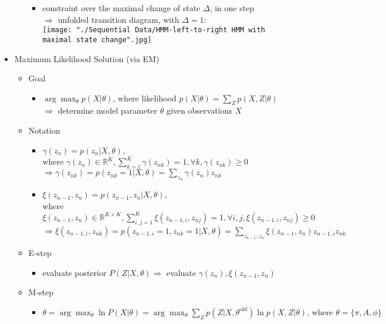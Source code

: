 \begin{itemize}
\begin{itemize}
\begin{itemize}
		\item constraint over the maximal change of state $\Delta$, in one step \\
		$\Rightarrow$ unfolded transition diagram, with $\Delta=1$: \\ 
		\texttt{[image: "./Sequential Data/HMM-left-to-right HMM with maximal state change".jpg]}
		\end{itemize}
	\end{itemize}

\item Maximum Likelihood Solution (via EM)
	\begin{itemize}
	\item Goal
		\begin{itemize}
		\item $\displaystyle \arg\max_{\theta} p(X|\theta)$, where likelihood $\displaystyle p(X|\theta) = \sum_Z p(X,Z|\theta)$ \\
		$\Rightarrow$ determine model parameter $\theta$ given observations $X$
		\end{itemize}
	\item Notation
		\begin{itemize}
		\item $\gamma(z_n) = p(z_n|X,\theta)$, \\
		where $\displaystyle \gamma(z_n) \in \mathbb R^{K} , \sum_{k=1}^K \gamma(z_{nk}) = 1,\forall k,\gamma(z_{nk})\ge0$ \\ 
		$\displaystyle\Rightarrow \gamma(z_{nk}) = p(z_{nk}=1|X,\theta) = \sum_{z_n}\gamma(z_n)z_{nk}$ 
		\item $\xi(z_{n-1},z_n) = p(z_{n-1},z_n|X,\theta)$, \\
		where $\displaystyle \xi(z_{n-1},z_n)\in\mathbb R^{K\times K},\sum_{i,j=1}^K \xi(z_{n-1,i},z_{nj} ) = 1, \forall i,j, \xi(z_{n-1,i},z_{nj})\ge0$ \\
		$\displaystyle \Rightarrow \xi(z_{n-1,i},z_{nk}) = p(z_{n-1,i}=1,z_{nk}=1|X,\theta) = \sum_{z_{n-1},z_n}\xi(z_{n-1},z_n)z_{n-1,i} z_{nk}$ 		
		\end{itemize}
	\item E-step
		\begin{itemize}
		\item evaluate posterior $P(Z|X,\theta) \Rightarrow$ evaluate $\gamma(z_n), \xi(z_{n-1},z_n)$
		\end{itemize}
	\item M-step
		\begin{itemize}
		\item $\displaystyle \theta = \arg \max_{\theta}\ln P(X|\theta) = \arg\max_{\theta}\sum_Z p(Z|X,\theta^\text{old})\ln p(X,Z|\theta) \text{, where } \theta = \{\pi,A,\phi\}$

\end{itemize}
\end{itemize}
\end{itemize}
